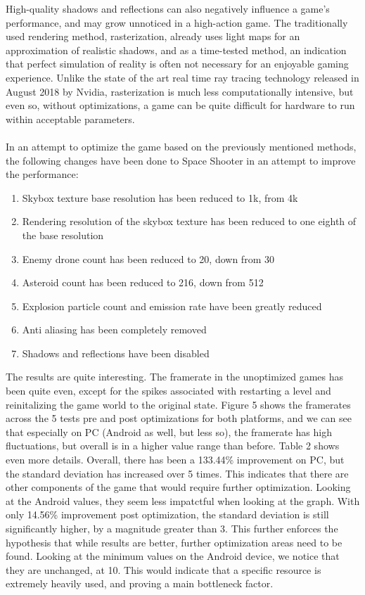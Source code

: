 High-quality shadows and reflections can also negatively influence a game's performance, and may grow unnoticed in a high-action game. The traditionally used rendering method, rasterization, already uses light maps for an approximation of realistic shadows, and as a time-tested method, an indication that perfect simulation of reality is often not necessary for an enjoyable gaming experience. Unlike the state of the art real time ray tracing technology released in August 2018 by Nvidia, rasterization is much less computationally intensive, but even so, without optimizations, a game can be quite difficult for hardware to run within acceptable parameters. \\ \\
In an attempt to optimize the game based on the previously mentioned methods, the following changes have been done to Space Shooter in an attempt to improve the performance:
\begin{enumerate}
\item{Skybox texture base resolution has been reduced to 1k, from 4k}
\item{Rendering resolution of the skybox texture has been reduced to one eighth of the base resolution}
\item{Enemy drone count has been reduced to 20, down from 30}
\item{Asteroid count has been reduced to 216, down from 512}
\item{Explosion particle count and emission rate have been greatly reduced}
\item{Anti aliasing has been completely removed}
\item{Shadows and reflections have been disabled}
\end{enumerate}
The results are quite interesting. The framerate in the unoptimized games has been quite even, except for the spikes associated with restarting a level and reinitalizing the game world to the original state. Figure 5 shows the framerates across the 5 tests pre and post optimizations for both platforms, and we can see that especially on PC (Android as well, but less so), the framerate has high fluctuations, but overall is in a higher value range than before. Table 2 shows even more details. Overall, there has been a 133.44\% improvement on PC, but the standard deviation has increased over 5 times. This indicates that there are other components of the game that would require further optimization. Looking at the Android values, they seem less impatctful when looking at the graph. With only 14.56\% improvement post optimization, the standard deviation is still significantly higher, by a magnitude greater than 3. This further enforces the hypothesis that while results are better, further optimization areas need to be found. Looking at the minimum values on the Android device, we notice that they are unchanged, at 10. This would indicate that a specific resource is extremely heavily used, and proving a main bottleneck factor.
